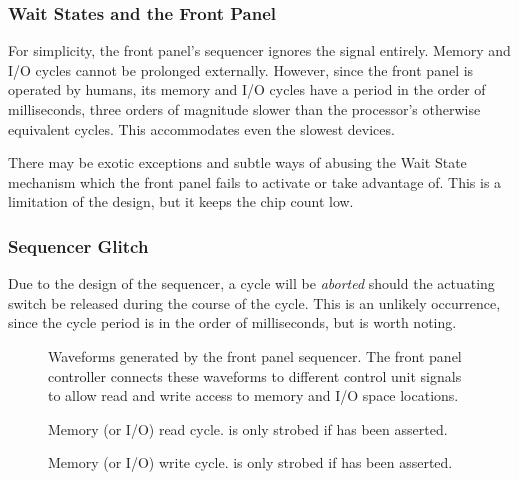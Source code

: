 \subsubsection{Wait States and the Front Panel}

For simplicity, the front panel's sequencer ignores the  signal
entirely. Memory and I/O cycles cannot be prolonged
externally. However, since the front panel is operated by humans, its
memory and I/O cycles have a period in the order of milliseconds,
three orders of magnitude slower than the processor's otherwise
equivalent cycles. This accommodates even the slowest devices.

There may be exotic exceptions and subtle ways of abusing the
\gls{Wait State} mechanism which the front panel fails to activate or
take advantage of. This is a limitation of the design, but it keeps
the chip count low.

\subsubsection{Sequencer Glitch}

Due to the design of the sequencer, a cycle will be {\em aborted\/}
should the actuating switch be released during the course of the
cycle. This is an unlikely occurrence, since the cycle period is in
the order of milliseconds, but is worth noting.

\begin{figure}[tb]
\centering
{}
\caption[Waveforms generated by the front panel
  sequencer]{\label{fig-panel-mc}Waveforms generated by the front panel
  sequencer. The front panel controller connects these waveforms to different
  control unit signals to allow read and write access to memory and I/O space
  locations.}
\end{figure}

\begin{figure}[t]
\centering
{}
\caption[Memory (or I/O) read cycle]{\label{fig-panel-mcr}
  Memory (or I/O) read cycle.  is only
  strobed if  has been asserted.}
\end{figure}

\begin{figure}[t]
\centering
{}
\caption[Memory (or I/O) write cycle]{\label{fig-panel-mcw} Memory (or
  I/O) write cycle.  is only strobed if  has
  been asserted.}
\end{figure}


